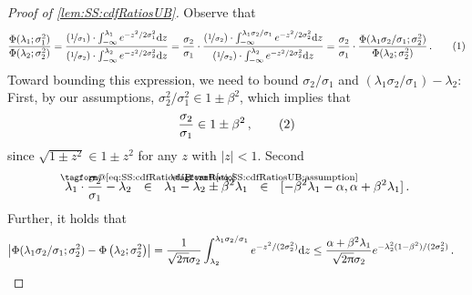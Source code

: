 \documentclass[11pt,letterpaper]{article}
\makeatletter
\theoremstyle{plain}
\theoremstyle{definition}
\theoremstyle{remark}
\newcommand{\yesnum}{\addtocounter{equation}{1}\tag{\theequation}}
\renewcommand{\eqref}[1]{\textup{\eqrefform@{\ref{#1}}}}
\let\eqrefform@\tagform@
\newcommand{\Stackrel}[2]{\stackrel{\mathmakebox[\widthof{\ensuremath{#2}}]{#1}}{#2}}
\def\abs#1{\left| #1 \right|}
\newcommand{\inparen}[1]{\ensuremath{\left(#1\right)}}
\newcommand{\sfrac}[2]{{#1/#2}}
\newcommand{\nfrac}[2]{\nicefrac{#1}{#2}}
\renewcommand{\pi}{\uppi}
\renewcommand{\d}{{\rm d}}
\makeatother
\begin{document}
{{{            \begin{proof}[Proof of \cref{lem:SS:cdfRatiosUB}]
                Observe that 
                \[
                    \frac{\Phi(\lambda_1;\sigma_1^2)}{\Phi(\lambda_2;\sigma_2^2)}
                    = \frac{
                        \inparen{\nfrac{1}{\sigma_1}}\cdot \int_{-\infty}^{\lambda_1} e^{-\sfrac{z^2}{2\sigma_1^2}} \d z
                    }{
                        \inparen{\nfrac{1}{\sigma_2}}\cdot \int_{-\infty}^{\lambda_2} e^{-\sfrac{z^2}{2\sigma_2^2}} \d z
                    }
                    = \frac{\sigma_2}{\sigma_1}\cdot \frac{
                        \inparen{\nfrac{1}{\sigma_2}}\cdot \int_{-\infty}^{\lambda_1\sigma_2/\sigma_1} e^{-\sfrac{z^2}{2\sigma_2^2}} \d z
                    }{
                        \inparen{\nfrac{1}{\sigma_2}}\cdot \int_{-\infty}^{\lambda_2} e^{-\sfrac{z^2}{2\sigma_2^2}} \d z
                    }
                    = \frac{\sigma_2}{\sigma_1}\cdot \frac{\Phi(\lambda_1\sigma_2/\sigma_1;\sigma_2^2)}{\Phi(\lambda_2;\sigma_2^2)}\,.
                    \yesnum\label{eq:SS:cdfRatiosUB:equality}
                \]
                Toward bounding this expression, we need to bound $\sfrac{\sigma_2}{\sigma_1}$ and $(\lambda_1\sigma_2/\sigma_1) - \lambda_2$:
                First, by our assumptions, $\sfrac{\sigma_2^2}{\sigma_1^2}\in 1\pm \beta^2$, which implies that 
                \[
                    \frac{\sigma_2}{\sigma_1}\in 1\pm \beta^2\,,
                    \yesnum\label{eq:SS:cdfRatiosUB:varRatio}
                \]
                since $\sqrt{1\pm z^2}\in 1\pm z^2$ for any $z$ with $\abs{z}<1$.
                Second 
                \[
                    \lambda_1\cdot \frac{\sigma_2}{\sigma_1}- \lambda_2
                    ~~\Stackrel{\eqref{eq:SS:cdfRatiosUB:varRatio}}{\in}~~ \lambda_1 - \lambda_2 \pm \beta^2 \lambda_1 
                    ~~\Stackrel{\eqref{eq:SS:cdfRatiosUB:assumption}}{\in}~~ [-\beta^2 \lambda_1 -\alpha,\alpha+\beta^2 \lambda_1 ]\,.
                \]
                Further, it holds that 
                \begin{align*}
                    \abs{\Phi(\lambda_1\sigma_2/\sigma_1;\sigma_2^2) 
                    - \Phi\inparen{\lambda_2; \sigma_2^2}}
                    &= \frac{1}{\sqrt{2\pi}\sigma_2}\int_{\lambda_2}^{\sfrac{\lambda_1\sigma_2}{\sigma_1}} e^{-z^2/(2\sigma_2^2)}\d z
                    \leq 
                    \frac{\alpha+\beta^2\lambda_1 }{\sqrt{2\pi}\sigma_2}
                     e^{-\lambda_2^2(1-\beta^2)/(2\sigma_2^2)}\,. %
                \end{align*}

\end{proof}}}}
\end{document}
